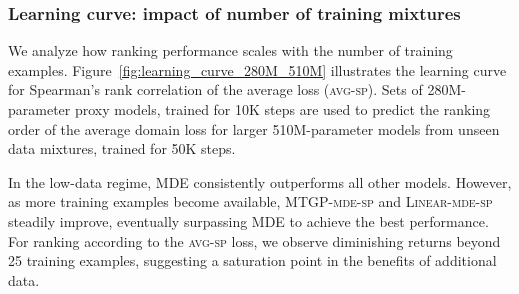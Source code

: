  
\subsubsection*{Learning curve: impact of number of training mixtures}

We analyze how ranking performance scales with the number of training examples. Figure~\ref{fig:learning_curve_280M_510M} illustrates the learning curve for Spearman's rank correlation of the average loss (\textsc{avg-sp}). Sets of 280M-parameter proxy models, trained for 10K steps are used to predict the ranking order of the average domain loss for larger 510M-parameter models from unseen data mixtures, trained for 50K steps.

In the low-data regime,  MDE consistently outperforms all other models. However, as more training examples become available, MTGP-\textsc{mde-sp} and \textsc{Linear}-\textsc{mde-sp} steadily improve, eventually surpassing MDE to achieve the best performance. For ranking according to the \textsc{avg-sp} loss, we observe diminishing returns beyond 25 training examples, suggesting a saturation point in the benefits of additional data.



